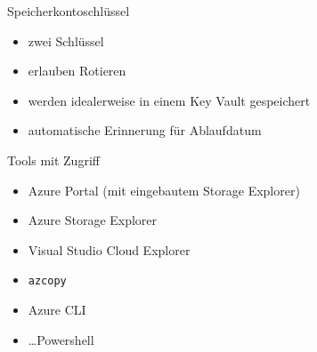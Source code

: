\begin{flashcard}[Definition]{Speicherkontoschlüssel}
  \begin{itemize}
    \item zwei Schlüssel
    \item erlauben Rotieren
    \item werden idealerweise in einem Key Vault gespeichert
    \item automatische Erinnerung für Ablaufdatum
  \end{itemize}
\end{flashcard}



\begin{flashcard}[Definition]{Tools mit Zugriff}
  \begin{itemize}
    \item Azure Portal (mit eingebautem Storage Explorer)
    \item Azure Storage Explorer
    \item Visual Studio Cloud Explorer
    \item \texttt{azcopy}
    \item Azure CLI
    \item \ldots Powershell
  \end{itemize}
\end{flashcard}
